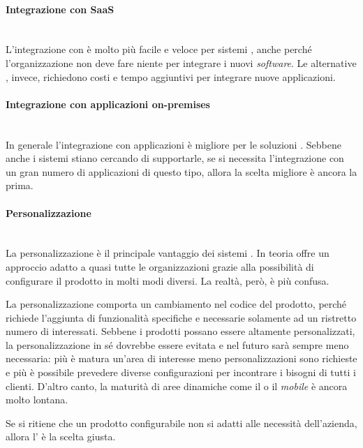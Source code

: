 \paragraph{Integrazione con SaaS} \mbox{} \\
L'integrazione con  è molto più facile e veloce per sistemi , anche perché l'organizzazione non deve fare niente per integrare i nuovi \textit{software}. Le alternative , invece, richiedono costi e tempo aggiuntivi per integrare nuove applicazioni.

\paragraph{Integrazione con applicazioni on-premises} \mbox{} \\
In generale l'integrazione con applicazioni  è migliore per le soluzioni . Sebbene anche i sistemi  stiano cercando di supportarle, se si necessita l'integrazione con un gran numero di applicazioni di questo tipo, allora la scelta migliore è ancora la prima.

\paragraph{Personalizzazione} \mbox{} \\
La personalizzazione è il principale vantaggio dei sistemi . In teoria  offre un approccio adatto a quasi tutte le organizzazioni grazie alla possibilità di configurare il prodotto in molti modi diversi. La realtà, però, è più confusa. 

La personalizzazione comporta un cambiamento nel codice del prodotto, perché richiede l'aggiunta di funzionalità specifiche e necessarie solamente ad un ristretto numero di interessati. Sebbene i prodotti  possano essere altamente personalizzati, la personalizzazione in sé dovrebbe essere evitata e nel futuro sarà sempre meno necessaria: più è matura un'area di interesse meno personalizzazioni sono richieste e più è possibile prevedere diverse configurazioni per incontrare i bisogni di tutti i clienti. D'altro canto, la maturità di aree dinamiche come il  o il \textit{mobile} è ancora molto lontana. 

Se si ritiene che un prodotto configurabile non si adatti alle necessità dell'azienda, allora l' è la scelta giusta.

